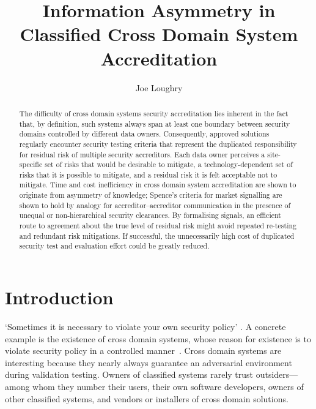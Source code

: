 \documentclass{llncs}
\begin{document}
\title{Information Asymmetry in Classified Cross Domain System Accreditation}
\author{Joe Loughry}

\maketitle

\begin{abstract}
The difficulty of cross domain systems security accreditation lies
inherent in the fact that, by definition, such systems always span at least
one boundary between security domains controlled by different data
owners. Consequently, approved solutions regularly encounter security
testing criteria that represent the duplicated responsibility for
residual risk of multiple security accreditors.  Each data owner perceives a
site-specific set of risks that would be desirable to mitigate,
a technology-dependent set of risks that it is possible to mitigate,
and a residual risk it is
felt acceptable not to mitigate.  Time and cost inefficiency in cross
domain system accreditation are shown to originate from asymmetry
of knowledge; Spence's criteria for market signalling are
shown to hold by analogy for accreditor--accreditor communication in the
presence of unequal or non-hierarchical security clearances.
By formalising signals, an efficient route to agreement about the true
level of residual risk might avoid repeated re-testing and redundant
risk mitigations.  If successful, the unnecessarily high cost of duplicated
security test and evaluation effort could be greatly reduced.
\end{abstract}

\section{Introduction}

`Sometimes it is necessary to violate your own security policy' \cite{Loughry2012b}.
A concrete example is the existence of cross domain systems,
whose reason for existence is to violate security policy in a controlled
manner~\cite{DCID-6/3a}.
Cross domain systems are interesting because they nearly always guarantee an adversarial
environment during validation testing.  Owners of classified
systems rarely trust outsiders---among whom
they number their users, their own software developers, owners of other
classified systems, and vendors or installers of cross domain solutions.
\end{document}

